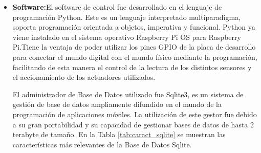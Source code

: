 \begin{itemize}
    \item \textbf{Software:}El software de control fue desarrollado en el lenguaje de programación Python. Este es un lenguaje interpretado multiparadigma, soporta programación orientada a objetos, imperativa y funcional.
    Python ya viene instalado en el sistema operativo Raspberry Pi OS para Raspberry Pi.Tiene la ventaja de poder utilizar los pines GPIO de la placa de desarrollo para conectar el mundo digital con el mundo físico mediante la programación, facilitando de esta manera el control de la lectura de los distintos sensores y el accionamiento de los actuadores utilizados.
    
    El administrador de Base de Datos utilizado fue Sqlite3, es un sistema de gestión de base de datos ampliamente difundido en el mundo de la programación de aplicaciones móviles.
    La utilización de este gestor fue debido a su gran portabilidad y su capacidad  de gestionar bases de datos de hasta 2 terabyte de tamaño.
    En la Tabla \ref{tab:caract_sqlite} se muestran las características más relevantes de la Base de Datos Sqlite.


\end{itemize}

